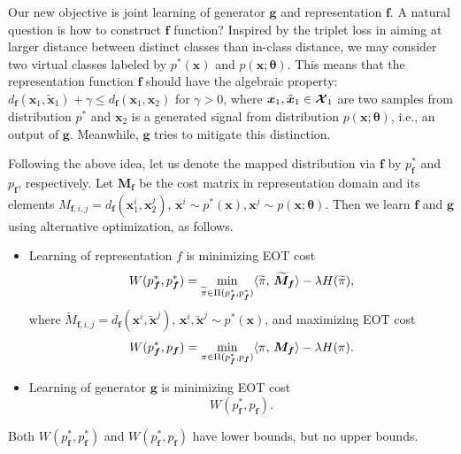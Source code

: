 Our new objective is joint learning of generator $\bm{g}$ and representation $\bm{f}$. A natural question is how to construct $\bm{f}$ function? {Inspired by the triplet loss in \cite{7298682} aiming at larger distance between distinct classes than in-class distance, we may consider two virtual classes labeled by $p^{\ast}(\bm{x})$ and $p(\bm{x};\bm{\theta})$.
This means that the representation function $\bm{f}$ should have the algebraic property: $ d_{\bm{f}}(\bm{x}_1, \tilde{\bm{x}}_1) + \gamma \leq d_{\bm{f}}(\bm{x}_1, \bm{x}_2) $ for $\gamma > 0$, where $\bm{x}_1, \tilde{\bm{x}}_1 \in \bm{\mathcal{X}}_1$ are two samples from distribution $p^{\ast}$ and $\bm{x}_2$ is a generated signal from distribution $p(\bm{x};\bm{\theta})$, i.e., an output of $\bm{g}$. Meanwhile, $\bm{g}$ tries to mitigate this distinction.}

Following the above idea, let us denote the mapped distribution via $\bm{f}$ by $p^{\ast}_{\bm{f}}$ and $p_{\bm{f}}$, respectively. Let $\bm{M}_{\bm{f}}$ be the cost matrix in representation domain and its elements $M_{\bm{f},{i,j}} = d_{\bm{f}}(\bm{x}^{i}_1, \bm{x}^{j}_2)$, $\bm{x}^{i} \sim p^{\ast}(\bm{x}), \bm{x}^{j}\sim p(\bm{x}; \bm{\theta})$. Then we learn $\bm{f}$ and $\bm{g}$ using alternative optimization, as follows. 
\begin{itemize}
\item Learning of representation $f$ is minimizing EOT cost
  \begin{equation}\label{eq-sim-in}
    W(p^{\ast}_{\bm{f}},p^{\ast}_{\bm{f}}) = \min_{\widetilde{\pi} \in \Pi(p^{\ast}_{\bm{f}}, p^{\ast}_{\bm{f}}) } \langle \widetilde{\pi},\,\widetilde{\bm{M}}_{\bm{f}}\rangle - \lambda H(\widetilde{\pi}),
  \end{equation}
  where $\widetilde{M}_{\bm{f}, {i,j}} = d_{\bm{f}}(\bm{x}^{i}, \tilde{\bm{x}}^{j})$, $\bm{x}^{i}, \tilde{\bm{x}}^{j} \sim p^{\ast}(\bm{x})$, and maximizing EOT cost
  \begin{equation}\label{eq-sim-ex}
    W(p^{\ast}_{\bm{f}}, p_{\bm{f}}) = \min_{{\pi} \in \Pi(p^{\ast}_{\bm{f}}, p_{\bm{f}}) } \dotp{{\pi}}{\bm{M_f}} - \la H({\pi}).\vspace{-8pt}
  \end{equation}
\item Learning of generator $\bm{g}$ is minimizing EOT cost
  \begin{equation}
    W(p^{\ast}_{\bm{f}}, p_{\bm{f}}).
  \end{equation}
\end{itemize} 
Both $W(p^{\ast}_{\bm{f}}, p^{\ast}_{\bm{f}})$ and $W(p^{\ast}_{\bm{f}}, p_{\bm{f}})$ have lower bounds, but no upper bounds. 
